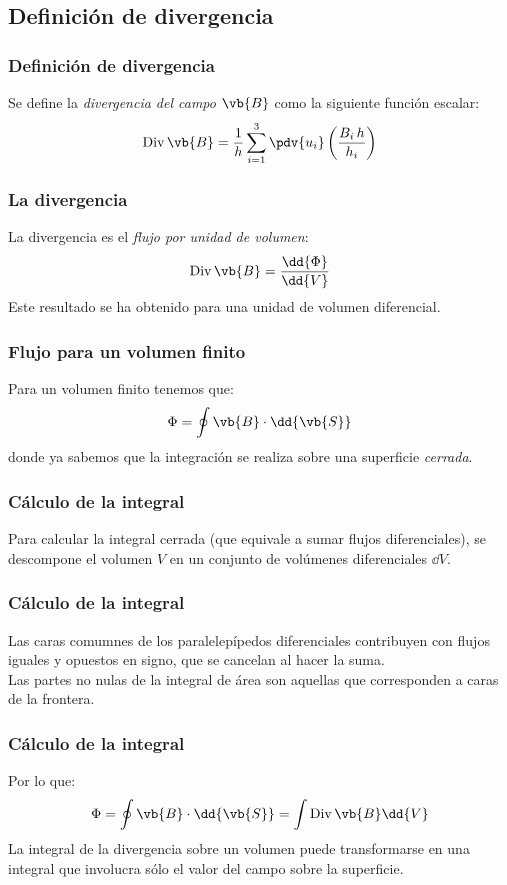 \subsection{Definición de divergencia}
\begin{frame}
\frametitle{Definición de divergencia}
Se define la \emph{divergencia del campo $\vb{B}$} como la siguiente función escalar:
\begin{align}
{\rm Div} \, \vb{B} = \dfrac{1}{h} \sum_{i=1}^{3} \pdv{u_{i}} \left( \dfrac{B_{i} \, h}{h_{i}} \right)
\label{eq:ecuacion_01_30}
\end{align}
\end{frame}
\begin{frame}
\frametitle{La divergencia}
La divergencia es el \emph{flujo por unidad de volumen}:
\begin{align*}
{\rm Div} \, \vb{B} = \dfrac{\dd{\Phi}}{\dd{V}}
\end{align*}
\pause
Este resultado se ha obtenido para una unidad de volumen diferencial.
\end{frame}
\begin{frame}
\frametitle{Flujo para un volumen finito}
Para un volumen finito tenemos que:
\begin{align*}
\Phi = \oint \vb{B} \cdot \dd{\vb{S}}
\end{align*}
donde ya sabemos que la integración se realiza sobre una superficie \emph{cerrada}.
\end{frame}
\begin{frame}
\frametitle{Cálculo de la integral}
Para calcular la integral cerrada (que equivale a sumar flujos diferenciales), se descompone el volumen $V$ en un conjunto de volúmenes diferenciales $\dd{V}$.
\end{frame}
\begin{frame}
\frametitle{Cálculo de la integral}
Las caras comumnes de los paralelepípedos diferenciales contribuyen con flujos iguales y opuestos en signo, que se cancelan al hacer la suma.
\\
\bigskip
\pause
Las partes no nulas de la integral de área son aquellas que corresponden a caras de la frontera.
\end{frame}
\begin{frame}
\frametitle{Cálculo de la integral}
Por lo que:
\begin{align*}
\Phi = \oint \vb{B} \cdot \dd{\vb{S}} = \int {\rm Div} \, \vb{B} \dd{V}
\end{align*}
\pause
La integral de la divergencia sobre un volumen puede transformarse en una integral que involucra sólo el valor del campo sobre la superficie.
\end{frame}
